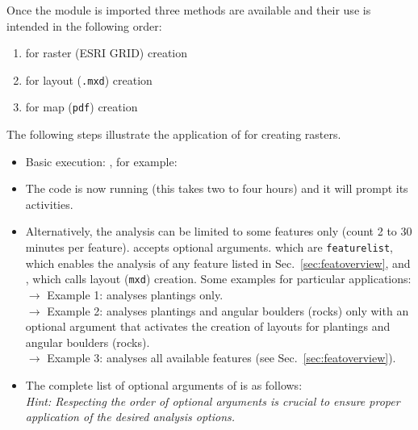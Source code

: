 Once the module is imported three methods are available and their use is intended in the following order:
\begin{enumerate}
	\item {} for raster (ESRI GRID) creation
	\item {} for layout (\texttt{.mxd}) creation
	\item {} for map (\texttt{pdf}) creation
\end{enumerate}

The following steps illustrate the application of  for creating rasters.
\begin{itemize}
	\item Basic execution: , for example: 
	\item The code is now running (this takes two to four hours) and it will prompt its activities.
	\item Alternatively, the analysis can be limited to some features only (count 2 to 30 minutes per feature).  accepts optional arguments. which are \texttt{feature{\myUnderscore}list}, which enables the analysis of any feature listed in Sec.~\ref{sec:featoverview}, and , which calls layout (\texttt{mxd}) creation. Some examples for particular applications:\\
	$\rightarrow$ Example 1:  analyses plantings only.\\
	$\rightarrow$ Example 2:  analyses plantings and angular boulders (rocks) only with an optional argument  that activates the creation of layouts for plantings and angular boulders (rocks).\\
	$\rightarrow$ Example 3:  analyses all available features (see Sec.~\ref{sec:featoverview}).
	\item The complete list of optional arguments of  is as follows:\\
				\textit{Hint: Respecting the order of optional arguments is crucial to ensure proper application of the desired analysis options.}
				\begin{itemize}

\end{itemize}
\end{itemize}
